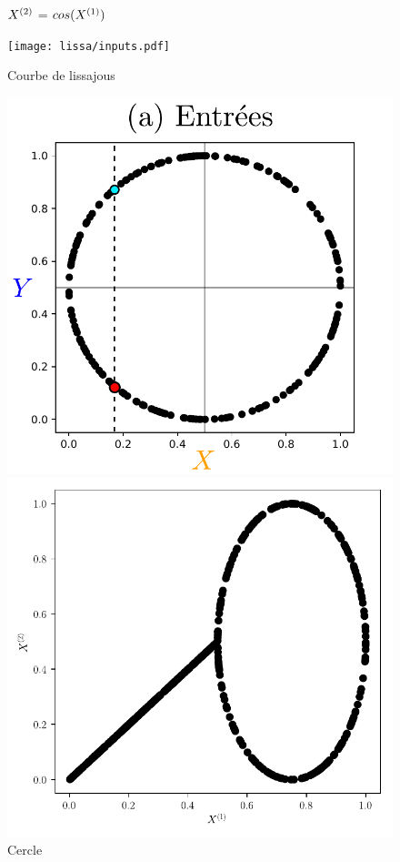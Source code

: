 \documentclass[../main]{subfiles}
\begin{document}
\begin{figure}
\begin{minipage}{\textwidth}
\begin{minipage}{0.3\textwidth}
			\caption{$X^{({2})}$ = $cos(X^{({1})})$ \label{fig:cos}}
		\end{minipage}
		\begin{minipage}{0.3\textwidth}
			\texttt{[image: lissa/inputs.pdf]}
			\caption{Courbe de lissajous}
		\end{minipage}
	\end{minipage}
	\begin{minipage}{\textwidth}
		\begin{minipage}{0.3\textwidth}
			\includegraphics[width=\textwidth]{2som_inp_noU.pdf}
			\caption{Cercle \label{fig:cercle}}
		\end{minipage}
		\begin{minipage}{0.3\textwidth}
			\includegraphics[width=\textwidth]{2som_mix001_in.pdf}

\end{minipage}
\end{minipage}
\end{figure}
\end{document}
